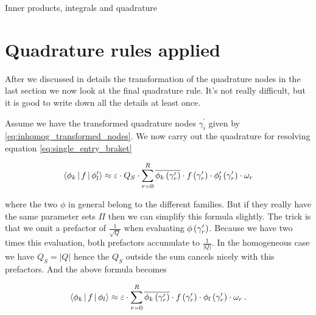 \begin{chapter}{Inner products, integrals and quadrature}
% 
% 


\section{Quadrature rules applied}

After we discussed in details the transformation of the quadrature nodes in the
last section we now look at the final quadrature rule. It's not really difficult,
but it is good to write down all the details at least once.

Assume we have the transformed quadrature nodes $\gamma_i^\prime$ given by \eqref{eq:inhomog_transformed_nodes}.
We now carry out the quadrature for resolving equation \eqref{eq:single_entry_braket}

\begin{equation}
\begin{split}
  \Braket{\phi_k | f | \phi_l^\prime}
  \approx
  \varepsilon \cdot Q_S \cdot \sum_{r=0}^R \overline{\phi_k\left( \gamma_r^\prime \right)} \cdot f\left( \gamma_r^\prime \right) \cdot \phi_l^\prime\left( \gamma_r^\prime \right) \cdot \omega_r
\end{split}
\end{equation}

where the two $\phi$ in general belong to the different families. But if they really
have the same parameter sets $\Pi$ then we can simplify this formula slightly. The
trick is that we omit a prefactor of $\frac{1}{\sqrt{Q}}$ when evaluating $\phi\left( \gamma_r^\prime \right)$.
Because we have two times this evaluation, both prefactors accumulate to $\frac{1}{|Q|}$.
In the homogeneous case we have $Q_S = |Q|$ hence the $Q_S$ outside the sum
cancels nicely with this prefactors. And the above formula becomes

\begin{equation} \label{eq:homogeneous_quadrature_rule}
\begin{split}
  \Braket{\phi_k | f | \phi_l}
  \approx
  \varepsilon \cdot \sum_{r=0}^R \overline{\phi_k\left( \gamma_r^\prime \right)} \cdot f\left( \gamma_r^\prime \right) \cdot \phi_l\left( \gamma_r^\prime \right) \cdot \omega_r \,.
\end{split}
\end{equation}

\end{chapter}
